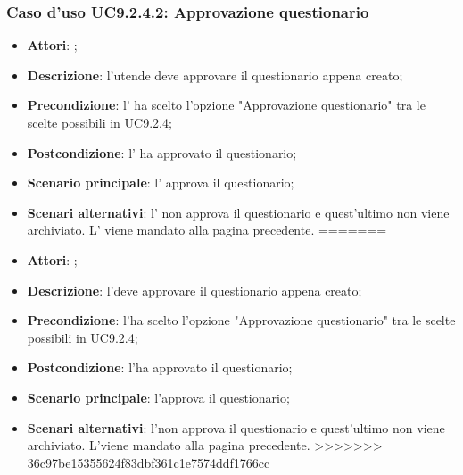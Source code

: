 			\subsubsection{Caso d'uso UC9.2.4.2: Approvazione questionario}
			\label{UC9.2.4.2}
			\begin{itemize}
<<<<<<< HEAD
				\item \textbf{Attori}: \uaupro{};
				\item \textbf{Descrizione}: l'utende deve approvare il questionario appena creato;
				\item \textbf{Precondizione}: l'\uaupro{} ha scelto l'opzione "Approvazione questionario" tra le scelte possibili in UC9.2.4; 
				\item \textbf{Postcondizione}: l'\uaupro{} ha approvato il questionario;
				\item \textbf{Scenario principale}: l'\uaupro{} approva il questionario;
				\item \textbf{Scenari alternativi}: l'\uaupro{} non approva il questionario e quest'ultimo non viene archiviato. L'\uaupro{} viene mandato alla pagina precedente.
=======
				\item \textbf{Attori}: \uaupro;
				\item \textbf{Descrizione}: l'\uaupro deve approvare il questionario appena creato;
				\item \textbf{Precondizione}: l'\uaupro ha scelto l'opzione "Approvazione questionario" tra le scelte possibili in UC9.2.4; 
				\item \textbf{Postcondizione}: l'\uaupro ha approvato il questionario;
				\item \textbf{Scenario principale}: l'\uaupro approva il questionario;
				\item \textbf{Scenari alternativi}: l'\uaupro non approva il questionario e quest'ultimo non viene archiviato. L'\uaupro viene mandato alla pagina precedente.
>>>>>>> 36c97be15355624f83dbf361c1e7574ddf1766cc
			\end{itemize}				
	 
